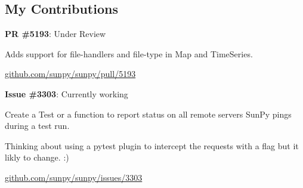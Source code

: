 \subsection{My Contributions}
    \textbf{PR \#5193}: Under Review
    \begin{focus}
        \item Adds support for file-handlers and file-type in Map and TimeSeries.
        \item \href{https://github.com/sunpy/sunpy/pull/5193}{github.com/sunpy/sunpy/pull/5193}
    \end{focus}
    \textbf{Issue \#3303}: Currently working
        \begin{focus}
            \item Create a Test or a function to report status on all remote servers SunPy pings during a test run.
            \item Thinking about using a pytest plugin to intercept the requests with a flag but it likly to change. :)
            \item \href{https://github.com/sunpy/sunpy/issues/3303}{github.com/sunpy/sunpy/issues/3303}
        \end{focus}
